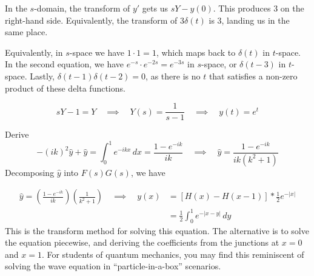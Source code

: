 \documentclass[a4paper]{article}
\begin{document}
In the \( s \)-domain, the transform of \( y' \) gets us \( sY - y \!\left( 0 \right) \). This produces \( 3 \) on the right-hand side. Equivalently, the transform of \( 3 \delta \!\left( t \right) \) is \( 3 \), landing us in the same place.

\newpage


Equivalently, in \( s \)-space we have \( 1 \cdot 1 = 1 \), which maps back to \( \delta \!\left( t \right) \) in \( t \)-space. In the second equation, we have \( e^{-s} \cdot e^{-2s} = e^{-3s} \) in \( s \)-space, or \( \delta \!\left( t - 3 \right) \) in \( t \)-space. Lastly, \( \delta \!\left( t - 1 \right) \delta \!\left( t - 2 \right) = 0 \), as there is no \( t \) that satisfies a non-zero product of these delta functions.

\vspace{12pt}


\[
	sY - 1 = Y \quad \implies \quad Y \!\left( s \right) = \frac{1}{s - 1} \quad \implies \quad y \!\left( t \right) = e^{t} 
\]


Derive
\[
	-\!\left( ik \right)^{2}\hat{y} + \hat{y} = \int^{1}_{0} e^{-ikx} \, dx = \frac{1 - e^{-ik}}{ik} \quad \implies \quad \hat{y} = \frac{1 - e^{-ik}}{ik \!\left( k^{2} + 1 \right)}
\]
Decomposing \( \hat{y} \) into \( F \!\left( s \right)G \!\left( s \right) \), we have

\begin{align*}
	\hat{y} = \left( \frac{1 - e^{-ik}}{ik} \right)\left( \frac{1}{k^{2} + 1} \right) \quad \implies \quad y(x) & = \left[ H(x) - H(x - 1) \right] * \frac{1}{2}e^{-|x|} \\
		      & = \frac{1}{2} \int_{0}^{1} e^{-|x - y|} \, dy
\end{align*}
This is the transform method for solving this equation. The alternative is to solve the equation piecewise, and deriving the coefficients from the junctions at \( x = 0 \) and \( x = 1 \). For students of quantum mechanics, you may find this reminiscent of solving the wave equation in ``particle-in-a-box'' scenarios.
\end{document}
